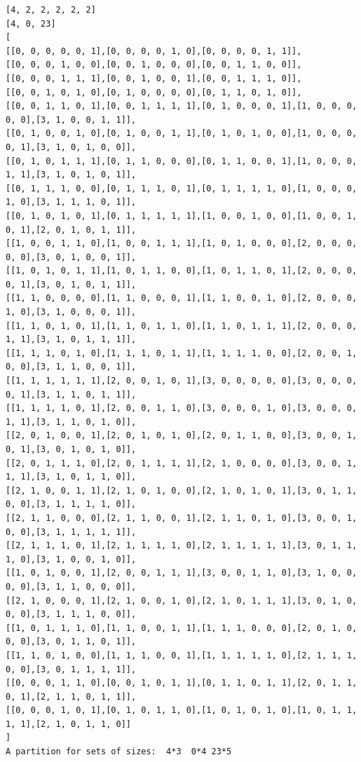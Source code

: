 \documentclass[final]{dmtcs-episciences}
\begin{document}
\begin{appendices}
\begin{verbatim}
[4, 2, 2, 2, 2, 2]
[4, 0, 23]
[
[[0, 0, 0, 0, 0, 1],[0, 0, 0, 0, 1, 0],[0, 0, 0, 0, 1, 1]],
[[0, 0, 0, 1, 0, 0],[0, 0, 1, 0, 0, 0],[0, 0, 1, 1, 0, 0]],
[[0, 0, 0, 1, 1, 1],[0, 0, 1, 0, 0, 1],[0, 0, 1, 1, 1, 0]],
[[0, 0, 1, 0, 1, 0],[0, 1, 0, 0, 0, 0],[0, 1, 1, 0, 1, 0]],
[[0, 0, 1, 1, 0, 1],[0, 0, 1, 1, 1, 1],[0, 1, 0, 0, 0, 1],[1, 0, 0, 0, 0, 0],[3, 1, 0, 0, 1, 1]],
[[0, 1, 0, 0, 1, 0],[0, 1, 0, 0, 1, 1],[0, 1, 0, 1, 0, 0],[1, 0, 0, 0, 0, 1],[3, 1, 0, 1, 0, 0]],
[[0, 1, 0, 1, 1, 1],[0, 1, 1, 0, 0, 0],[0, 1, 1, 0, 0, 1],[1, 0, 0, 0, 1, 1],[3, 1, 0, 1, 0, 1]],
[[0, 1, 1, 1, 0, 0],[0, 1, 1, 1, 0, 1],[0, 1, 1, 1, 1, 0],[1, 0, 0, 0, 1, 0],[3, 1, 1, 1, 0, 1]],
[[0, 1, 0, 1, 0, 1],[0, 1, 1, 1, 1, 1],[1, 0, 0, 1, 0, 0],[1, 0, 0, 1, 0, 1],[2, 0, 1, 0, 1, 1]],
[[1, 0, 0, 1, 1, 0],[1, 0, 0, 1, 1, 1],[1, 0, 1, 0, 0, 0],[2, 0, 0, 0, 0, 0],[3, 0, 1, 0, 0, 1]],
[[1, 0, 1, 0, 1, 1],[1, 0, 1, 1, 0, 0],[1, 0, 1, 1, 0, 1],[2, 0, 0, 0, 0, 1],[3, 0, 1, 0, 1, 1]],
[[1, 1, 0, 0, 0, 0],[1, 1, 0, 0, 0, 1],[1, 1, 0, 0, 1, 0],[2, 0, 0, 0, 1, 0],[3, 1, 0, 0, 0, 1]],
[[1, 1, 0, 1, 0, 1],[1, 1, 0, 1, 1, 0],[1, 1, 0, 1, 1, 1],[2, 0, 0, 0, 1, 1],[3, 1, 0, 1, 1, 1]],
[[1, 1, 1, 0, 1, 0],[1, 1, 1, 0, 1, 1],[1, 1, 1, 1, 0, 0],[2, 0, 0, 1, 0, 0],[3, 1, 1, 0, 0, 1]],
[[1, 1, 1, 1, 1, 1],[2, 0, 0, 1, 0, 1],[3, 0, 0, 0, 0, 0],[3, 0, 0, 0, 0, 1],[3, 1, 1, 0, 1, 1]],
[[1, 1, 1, 1, 0, 1],[2, 0, 0, 1, 1, 0],[3, 0, 0, 0, 1, 0],[3, 0, 0, 0, 1, 1],[3, 1, 1, 0, 1, 0]],
[[2, 0, 1, 0, 0, 1],[2, 0, 1, 0, 1, 0],[2, 0, 1, 1, 0, 0],[3, 0, 0, 1, 0, 1],[3, 0, 1, 0, 1, 0]],
[[2, 0, 1, 1, 1, 0],[2, 0, 1, 1, 1, 1],[2, 1, 0, 0, 0, 0],[3, 0, 0, 1, 1, 1],[3, 1, 0, 1, 1, 0]],
[[2, 1, 0, 0, 1, 1],[2, 1, 0, 1, 0, 0],[2, 1, 0, 1, 0, 1],[3, 0, 1, 1, 0, 0],[3, 1, 1, 1, 1, 0]],
[[2, 1, 1, 0, 0, 0],[2, 1, 1, 0, 0, 1],[2, 1, 1, 0, 1, 0],[3, 0, 0, 1, 0, 0],[3, 1, 1, 1, 1, 1]],
[[2, 1, 1, 1, 0, 1],[2, 1, 1, 1, 1, 0],[2, 1, 1, 1, 1, 1],[3, 0, 1, 1, 1, 0],[3, 1, 0, 0, 1, 0]],
[[1, 0, 1, 0, 0, 1],[2, 0, 0, 1, 1, 1],[3, 0, 0, 1, 1, 0],[3, 1, 0, 0, 0, 0],[3, 1, 1, 0, 0, 0]],
[[2, 1, 0, 0, 0, 1],[2, 1, 0, 0, 1, 0],[2, 1, 0, 1, 1, 1],[3, 0, 1, 0, 0, 0],[3, 1, 1, 1, 0, 0]],
[[1, 0, 1, 1, 1, 0],[1, 1, 0, 0, 1, 1],[1, 1, 1, 0, 0, 0],[2, 0, 1, 0, 0, 0],[3, 0, 1, 1, 0, 1]],
[[1, 1, 0, 1, 0, 0],[1, 1, 1, 0, 0, 1],[1, 1, 1, 1, 1, 0],[2, 1, 1, 1, 0, 0],[3, 0, 1, 1, 1, 1]],
[[0, 0, 0, 1, 1, 0],[0, 0, 1, 0, 1, 1],[0, 1, 1, 0, 1, 1],[2, 0, 1, 1, 0, 1],[2, 1, 1, 0, 1, 1]],
[[0, 0, 0, 1, 0, 1],[0, 1, 0, 1, 1, 0],[1, 0, 1, 0, 1, 0],[1, 0, 1, 1, 1, 1],[2, 1, 0, 1, 1, 0]]
]
A partition for sets of sizes:  4*3  0*4 23*5
\end{verbatim}
\newpage


\end{appendices}
\end{document}
